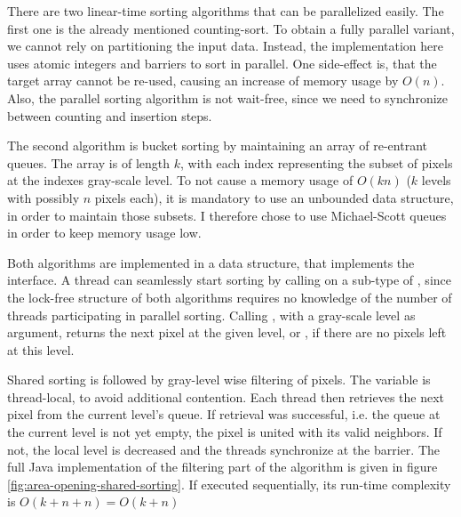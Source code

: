 There are two linear-time sorting algorithms that can be parallelized
easily. The first one is the already mentioned counting-sort. To obtain a fully
parallel variant, we cannot rely on partitioning the input data. Instead, the
implementation here uses atomic integers and barriers to sort in parallel. One
side-effect is, that the target array cannot be re-used, causing an increase of
memory usage by $O(n)$. Also, the parallel sorting algorithm is not wait-free,
since we need to synchronize between counting and insertion steps.

The second algorithm is bucket sorting by maintaining an array of re-entrant
queues. The array is of length $k$, with each index representing the subset of
pixels at the indexes gray-scale level. To not cause a memory usage of $O(kn)$
($k$ levels with possibly $n$ pixels each), it is mandatory to use an unbounded
data structure, in order to maintain those subsets. I therefore chose to use
Michael-Scott queues in order to keep memory usage low.

Both algorithms are implemented in a data structure, that implements the
 interface. A thread can seamlessly start sorting by
calling  on a sub-type of , since
the lock-free structure of both algorithms requires no knowledge of the number
of threads participating in parallel sorting. Calling , with a
gray-scale level as argument, returns the next pixel at the given level, or
, if there are no pixels left at this level.

Shared sorting is followed by gray-level wise filtering of pixels. The
 variable is thread-local, to avoid additional
contention. Each thread then retrieves the next pixel from the current level's
queue. If retrieval was successful, i.e. the queue at the current level is not
yet empty, the pixel is united with its valid neighbors. If not, the local level
is decreased and the threads synchronize at the barrier. The full Java
implementation of the filtering part of the algorithm is given in figure
\ref{fig:area-opening-shared-sorting}. If executed sequentially, its run-time
complexity is $O(k + n + n) = O(k + n)$


